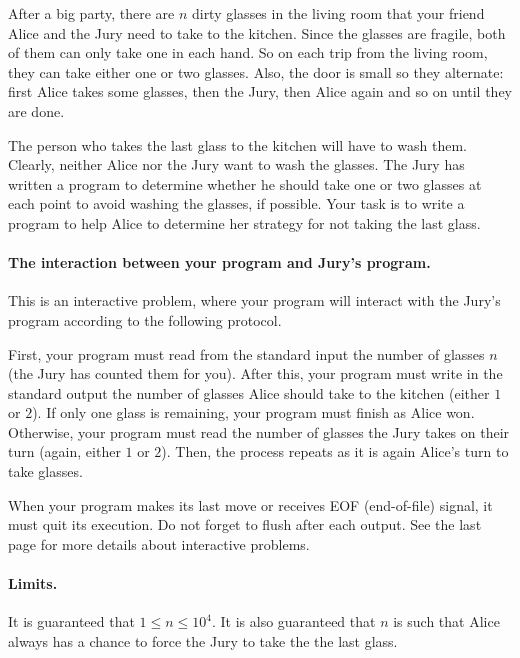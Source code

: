 After a big party, there are $n$ dirty glasses in the living room that your friend Alice and the Jury need to take to the kitchen.
Since the glasses are fragile, both of them can only take one in each hand.
So on each trip from the living room, they can take either one or two glasses.
Also, the door is small so they alternate: first Alice takes some glasses, then the Jury, then Alice again and so on until they are done.

The person who takes the last glass to the kitchen will have to wash them.
Clearly, neither Alice nor the Jury want to wash the glasses.
The Jury has written a program to determine whether he should take one or two glasses at each point to avoid washing the glasses, if possible.
Your task is to write a program to help Alice to determine her strategy for not taking the last glass.

\paragraph{The interaction between your program and Jury's program.}
This is an interactive problem, where your program will interact with the Jury's program according to the following protocol.

First, your program must read from the standard input the number of glasses $n$ (the Jury has counted them for you).
After this, your program must write in the standard output the number of glasses Alice should take to the kitchen (either $1$ or $2$).
If only one glass is remaining, your program must finish as Alice won.
Otherwise, your program must read the number of glasses the Jury takes on their turn (again, either $1$ or $2$).
Then, the process repeats as it is again Alice's turn to take glasses.

When your program makes its last move or receives EOF (end-of-file) signal, it must quit its execution.
Do not forget to flush after each output.
See the last page for more details about interactive problems.

\paragraph{Limits.}
It is guaranteed that $1 \leq n \leq 10^4$.
It is also guaranteed that $n$ is such that Alice always has a chance to force the Jury to take the the last glass.
{
\renewcommand{\sampleinputname}{Jury's output}
\renewcommand{\sampleoutputname}{Your output}
}
